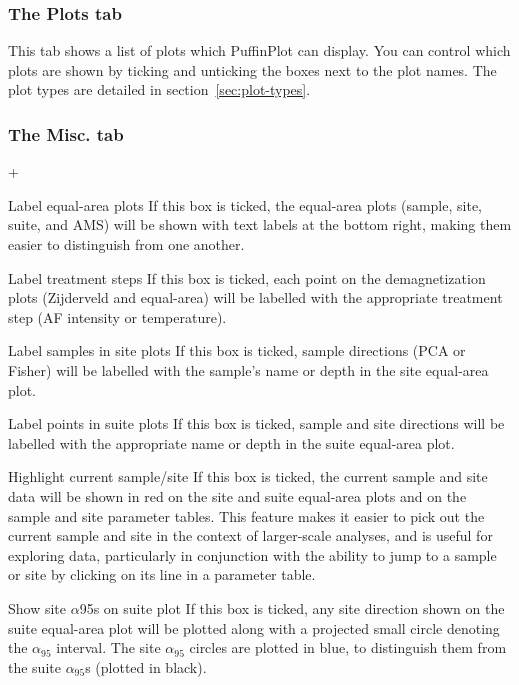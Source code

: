 \documentclass[a4paper,british]{article}
\newcommand{\menuitemlabel}[1]{%
\mbox{\textsf{#1}}\hfil}
\newenvironment{menuitemlist}%
{\begin{list}{}{%
\renewcommand{\makelabel}{\menuitemlabel}%
\setlength{\labelwidth}{35pt}%
\setlength{\leftmargin}%
             {\labelwidth+\labelsep}}}%
{\end{list}}
\newcommand{\ppcmd}[1]{\textsf{#1}} %
\newcommand{\alnifi}{$\alpha_{95}$}
\begin{document}
\subsubsection{The \ppcmd{Plots} tab}

This tab shows a list of plots which PuffinPlot can display. You can control
which plots are shown by ticking and unticking the boxes next to the plot
names. The plot types are detailed in section~\ref{sec:plot-types}.

\subsubsection{\label{sec:prefs-misc}The \ppcmd{Misc.} tab}

\begin{menuitemlist}

\item[Label equal-area plots] If this box is ticked, the equal-area plots
  (sample, site, suite, and AMS) will be shown with text labels at the bottom
  right, making them easier to distinguish from one another.

\item[Label treatment steps] If this box is ticked, each point on
  the demagnetization plots (Zijderveld and equal-area) will be
  labelled with the appropriate treatment step (AF intensity or
  temperature).

\item[Label samples in site plots] If this box is ticked, sample 
  directions (PCA or Fisher) will be labelled with the sample's
  name or depth in the site equal-area plot.

\item[Label points in suite plots] If this box is ticked, sample 
  and site directions will be labelled with the appropriate name or
  depth in the suite equal-area plot.

\item[Highlight current sample/site] If this box is ticked, the current
  sample and site data will be shown in red on the site and suite
  equal-area plots and on the sample and site parameter tables. This
  feature makes it easier to pick out the current sample and site in the
  context of larger-scale analyses, and is useful for exploring data,
  particularly in conjunction with the ability to jump to a sample
  or site by clicking on its line in a parameter table.

\item[Show site $\alpha$95s on suite plot] If this box is ticked, any
  site direction shown on the suite equal-area plot will be plotted
  along with a projected small circle denoting the \alnifi{} interval.
  The site \alnifi{} circles are plotted in blue, to distinguish them
  from the suite \alnifi{}s (plotted in black).


\end{menuitemlist}
\end{document}
